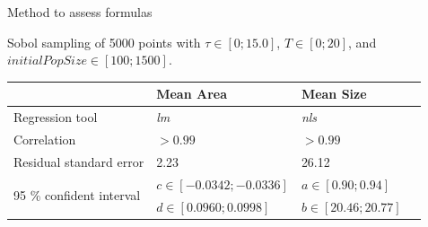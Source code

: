 \documentclass{myBeamer}
\begin{document}

\begin{frame}{Method to assess formulas}

Sobol sampling %
of 5000 points with $ \tau \in [0 ; 15.0]$, $T \in  [0 ; 20]$,  and $initialPopSize \in [100 ; 1500]$. 

\bigbreak

\renewcommand{\arraystretch}{1.8}
\begin{tabular}{|l|l|l|l|}
	\hline
       		&  Mean Area   & Mean Size   \\  
   	\hline
    Regression tool &     \textit{lm}     &     \textit{nls}    \\
	\hline    
    Correlation &  $>0.99$  &  $>0.99$  \\
    \hline	    
    Residual standard error	& 2.23  &   26.12   \\
	\hline    
	\multirow{2}{*}{95 \% confident interval}  &  $c \in [ -0.0342 ; -0.0336]$  & $a \in [ 0. 90 ; 0.94 ]$   \\
 	\cline{2-3} 
	&  $ d \in [0.0960 ; 0.0998]$	  & $b \in [20.46 ; 20.77]$ \\ 
	\hline
\end{tabular}
\end{frame}













%

\begin{frame}[allowframebreaks]
\tiny
\tiny
\end{frame}
	\backupend

%        
%		
\end{document}
